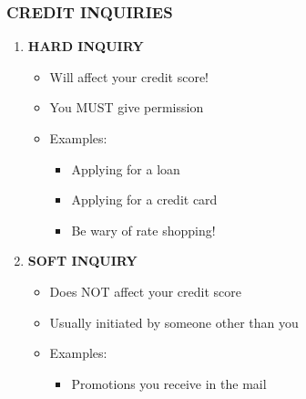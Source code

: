 \documentclass[12pt]{article}
\begin{document}
            \subsubsection{CREDIT INQUIRIES}
                \begin{enumerate}
                    \item \textbf{HARD INQUIRY}
                        \begin{itemize}
                            \item Will affect your credit score!
                            \item You MUST give permission
                            \item Examples:
                                \begin{itemize}
                                    \item Applying for a loan
                                    \item Applying for a credit card
                                    \item Be wary of rate shopping!
                                \end{itemize}
                        \end{itemize}
                    \item \textbf{SOFT INQUIRY}
                        \begin{itemize}
                            \item Does NOT affect your credit score
                            \item Usually initiated by someone other than you
                            \item Examples:
                                \begin{itemize}
                                    \item Promotions you receive in the mail
                                \end{itemize}
                        \end{itemize}
                \end{enumerate}
\end{document}
